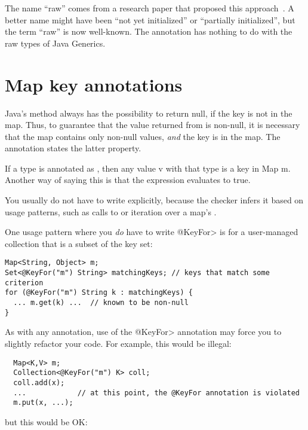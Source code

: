 The name ``raw'' comes from a research paper that proposed this
approach~\cite{FahndrichL2003}.
A better name might have been ``not yet initialized'' or ``partially
initialized'', but the term ``raw'' is now well-known.
The 
annotation has nothing to do with the raw types of Java Generics.


\section{Map key annotations\label{map-keys}}

Java's
method always has the possibility to return null, if the key is not in the
map.  Thus, to guarantee that the value returned from  is
non-null, it is necessary that the map contains only non-null values,
\emph{and} the key is in the map.
The  annotation states the latter
property.

If a type is annotated as , then any value v with that type
is a key in Map m.  Another way of saying this is that the expression
 evaluates to true.

You usually do not have to write  explicitly, because the
checker infers it based on usage patterns, such as calls to
 or iteration over a map's
.

One usage pattern where you \emph{do} have to write \<@KeyFor> is for a
user-managed collection that is a subset of the key set:

\begin{Verbatim}
Map<String, Object> m;
Set<@KeyFor("m") String> matchingKeys; // keys that match some criterion
for (@KeyFor("m") String k : matchingKeys) {
  ... m.get(k) ...  // known to be non-null
}
\end{Verbatim}

As with any annotation, use of the \<@KeyFor> annotation may force you to
slightly refactor your code.  For example, this would be illegal:

\begin{Verbatim}
  Map<K,V> m;
  Collection<@KeyFor("m") K> coll;
  coll.add(x);
  ...            // at this point, the @KeyFor annotation is violated
  m.put(x, ...);
\end{Verbatim}

but this would be OK:


